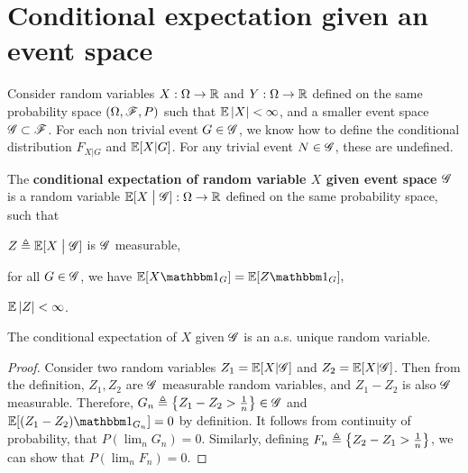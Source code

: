 \documentclass[letterpaper,10pt,english]{article}
\begin{document}
\section{Conditional expectation given an event space}
Consider random variables $X:\Omega\to\mathbb{R}$ and $Y:\Omega\to\mathbb{R}$ defined on the same probability space $(\Omega, \mathscr{F}, P)$ 
such that $\mathbb{E}\left\lvert X\right\rvert < \infty$, and a smaller event space $\mathscr{G} \subset \mathscr{F}$. 
For each non trivial event $G \in \mathscr{G}$, we know how to define the conditional distribution $F_{X|G}$ and $\mathbb{E}[X|G]$. 
For any trivial event $N \in \mathscr{G}$, these are undefined. 

\begin{defn}%
The \textbf{conditional expectation of random variable $X$ given event space $\mathscr{G}$} is a random variable $\mathbb{E}[X\; \big\vert \; \mathscr{G}]: \Omega \to \mathbb{R}$ defined on the same probability space, 
such that 
\begin{compactenum}[(i)]
\item $Z \triangleq \mathbb{E}[X\; \big\vert \; \mathscr{G}]$ is $\mathscr{G}$ measurable, %
\item for all $G\in \mathscr{G}$, we have
$
\E[X\Ind{G}] = \E[Z\Ind{G}], %
$
\item $\mathbb{E}\left\lvert Z\right\rvert<\infty$.
\end{compactenum}
\end{defn}
\begin{lem} 
The conditional expectation of $X$ given $\mathscr{G}$  is an a.s. unique random variable.
\end{lem}
\begin{proof}
Consider two random variables $Z_1 = \mathbb{E}[X|\mathscr{G}]$ and $Z_2 = \mathbb{E}[X|\mathscr{G}]$. 
Then from the definition, $Z_1, Z_2$ are $\mathscr{G}$ measurable random variables, 
and $Z_1-Z_2$ is also $\mathscr{G}$ measurable. 
Therefore, $G_n \triangleq \left\{Z_1 - Z_2 > \frac{1}{n}\right\} \in \mathscr{G}$ and $\E[(Z_1-Z_2)\Ind{G_n}] = 0$ by definition. 
It follows from continuity of probability, that $P(\lim_n G_n) = 0$. 
Similarly, defining $F_n \triangleq \left\{Z_2 - Z_1 > \frac 1 n\right\}$, we can show that $P(\lim_nF_n) = 0$. 
\end{proof}
\end{document}
